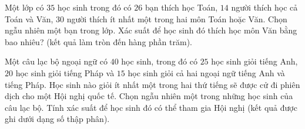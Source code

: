 \begin{ex}[Mức độ 2]%
	Một lớp có $35$ học sinh trong đó có $26$ bạn thích học Toán, $14$ người thích học cả Toán và Văn, $30$ người thích ít nhất một trong hai môn Toán hoặc Văn. Chọn ngẫu nhiên một bạn trong lớp. Xác suất để học sinh đó thích học môn Văn bằng bao nhiêu? (kết quả làm tròn đến hàng phần trăm).
\end{ex}

\begin{ex}[Mức độ 2]%
	Một câu lạc bộ ngoại ngữ có $40$ học sinh, trong đó có $25$ học sinh giỏi tiếng Anh, $20$ học sinh giỏi tiếng Pháp và $15$ học sinh giỏi cả hai ngoại ngữ tiếng Anh và tiếng Pháp. Học sinh nào giỏi ít nhất một trong hai thứ tiếng sẽ được cử đi phiên dịch cho một Hội nghị quốc tế. Chọn ngẫu nhiên một trong những học sinh của câu lạc bộ. Tính xác suất để học sinh đó có thể tham gia Hội nghị (kết quả được ghi dưới dạng số thập phân).
\end{ex}

